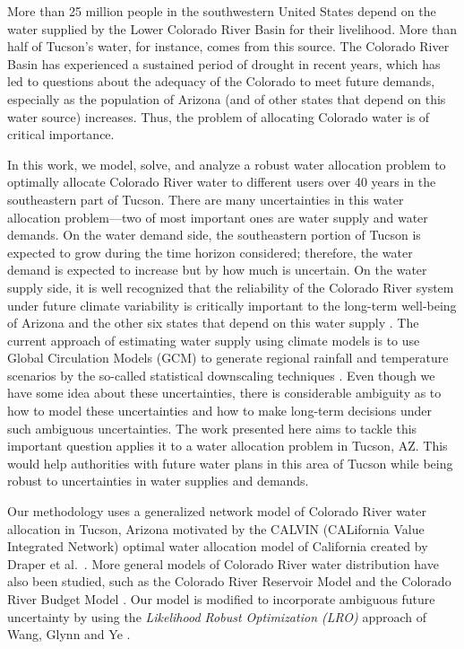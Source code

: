 \documentclass[12pt]{amsart}
\begin{document}
More than 25 million people in the southwestern United States depend on the water supplied by the Lower Colorado River Basin for their livelihood.
More than half of Tucson's water, for instance, comes from this source.
The Colorado River Basin has experienced a sustained period of drought in recent years, which has led to questions about the adequacy of the Colorado to meet future demands, especially as the population of Arizona (and of other states that depend on this water source) increases.
Thus, the problem of allocating Colorado water is of critical importance. 


In this work, we model, solve, and analyze a robust water allocation problem to optimally allocate Colorado River water to different users over 40 years in the southeastern part of Tucson.
There are many uncertainties in this water allocation problem---two of most important ones are water supply and water demands.  
On the water demand side, the southeastern portion of Tucson is expected to grow  during the time horizon considered; therefore, the water demand is expected to increase but by how much is uncertain. 
On the water supply side, it is well recognized that the reliability of the Colorado River system under future climate variability is critically important to the long-term well-being of Arizona and the other six states that depend on this water supply \cite{usbr_colorado_climate}. 
The current approach of estimating water supply using climate models is to use Global Circulation Models (GCM) to generate regional rainfall and temperature scenarios by the so-called statistical downscaling techniques \cite{christensen_lettenmaier_07,dibike_caulibaly_05}. 
Even though we have some idea about these uncertainties, there is considerable ambiguity as to how to model these uncertainties and how to make long-term decisions under such ambiguous uncertainties. 
The work presented here aims to tackle this important question applies it to a water allocation problem in Tucson, AZ. 
This would help authorities with future water plans in this area of Tucson while being robust to uncertainties in water supplies and demands.


Our methodology uses a generalized network model of Colorado River water allocation in Tucson, Arizona motivated by the CALVIN (CALifornia Value Integrated Network) optimal water allocation model of California created by Draper et al.\ \cite{draper_etal_03}.
More general models of Colorado River water distribution have also been studied, such as the Colorado River Reservoir Model \cite{christensen2004effects} and the Colorado River Budget Model \cite{barnett2009sustainable}.
Our model is modified to incorporate ambiguous future uncertainty by using the {\it Likelihood Robust Optimization (LRO)} approach of Wang, Glynn and Ye \cite{wang2010likelihood}.
\end{document}
